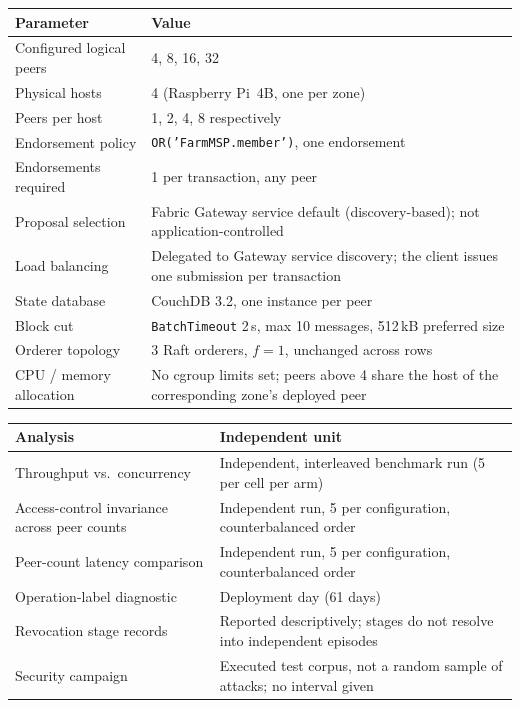 \begin{widetab}
\caption{Topology and routing for each peer-scaling configuration. The
  endorsement policy, orderer topology, batch parameters and state
  database are identical across rows; only configured logical peer count
  and its physical placement change.}
\label{tab:topology}
\small
\begin{tabularx}{\tblwidth}{@{}lX@{}}
\toprule
Parameter & Value \\
\midrule
Configured logical peers  & 4, 8, 16, 32 \\
Physical hosts            & 4 (Raspberry Pi~4B, one per zone) \\
Peers per host            & 1, 2, 4, 8 respectively \\
Endorsement policy        & \texttt{OR('FarmMSP.member')}, one endorsement \\
Endorsements required     & 1 per transaction, any peer \\
Proposal selection        & Fabric Gateway service default (discovery-based);
                            not application-controlled \\
Load balancing            & Delegated to Gateway service discovery; the
                            client issues one submission per transaction \\
State database            & CouchDB 3.2, one instance per peer \\
Block cut                 & \texttt{BatchTimeout} 2\,s, max 10 messages,
                            512\,kB preferred size \\
Orderer topology          & 3 Raft orderers, $f{=}1$, unchanged across rows \\
CPU / memory allocation   & No cgroup limits set; peers above 4 share the
                            host of the corresponding zone's deployed peer \\
\bottomrule
\end{tabularx}
\end{widetab}

\begin{widetab}
\caption{Experimental unit used for each analysis in the main article.}
\label{tab:units}
\small
\begin{tabularx}{\tblwidth}{@{}lX@{}}
\toprule
Analysis & Independent unit \\
\midrule
Throughput vs.\ concurrency &
  Independent, interleaved benchmark run (5 per cell per arm) \\
Access-control invariance across peer counts &
  Independent run, 5 per configuration, counterbalanced order \\
Peer-count latency comparison &
  Independent run, 5 per configuration, counterbalanced order \\
Operation-label diagnostic &
  Deployment day (61 days) \\
Revocation stage records &
  Reported descriptively; stages do not resolve into independent episodes \\
Security campaign &
  Executed test corpus, not a random sample of attacks; no interval given \\
\bottomrule
\end{tabularx}
\end{widetab}

